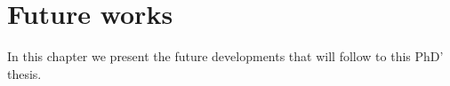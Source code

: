 \chapter{Future works}\label{cap:futureworks} 

In this chapter we present the future developments that will follow to this PhD' thesis.

\begin{itemize}

\lipsum
 
\end{itemize}

%    
